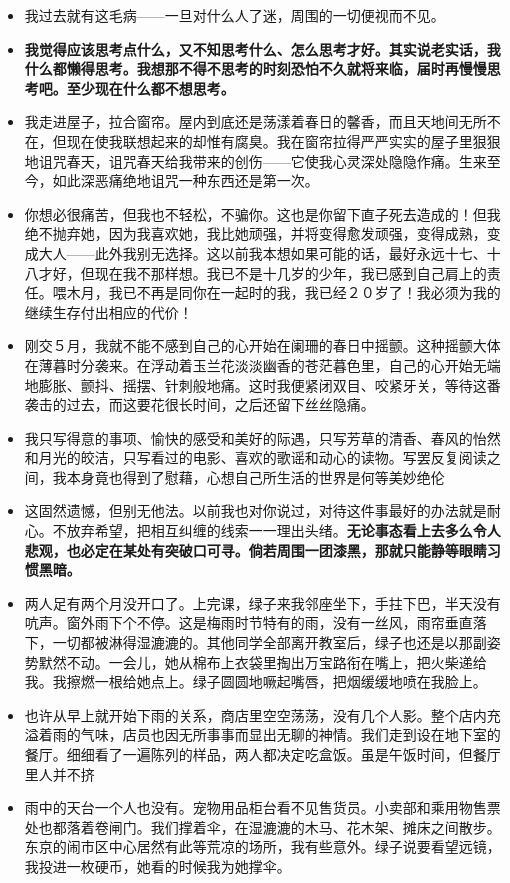 \documentclass[UTF8,a4paper,8pt]{ctexart}
\begin{document}
\begin{itemize}
 	\item 我过去就有这毛病——一旦对什么人了迷，周围的一切便视而不见。
 	\item \textbf{我觉得应该思考点什么，又不知思考什么、怎么思考才好。其实说老实话，我什么都懒得思考。我想那不得不思考的时刻恐怕不久就将来临，届时再慢慢思考吧。至少现在什么都不想思考。}
 	\item 我走进屋子，拉合窗帘。屋内到底还是荡漾着春日的馨香，而且天地间无所不在，但现在使我联想起来的却惟有腐臭。我在窗帘拉得严严实实的屋子里狠狠地诅咒春天，诅咒春天给我带来的创伤——它使我心灵深处隐隐作痛。生来至今，如此深恶痛绝地诅咒一种东西还是第一次。
 	\item 你想必很痛苦，但我也不轻松，不骗你。这也是你留下直子死去造成的！但我绝不抛弃她，因为我喜欢她，我比她顽强，并将变得愈发顽强，变得成熟，变成大人——此外我别无选择。这以前我本想如果可能的话，最好永远十七、十八才好，但现在我不那样想。我已不是十几岁的少年，我已感到自己肩上的责任。喂木月，我已不再是同你在一起时的我，我已经２０岁了！我必须为我的继续生存付出相应的代价！
 	\item 刚交５月，我就不能不感到自己的心开始在阑珊的春日中摇颤。这种摇颤大体在薄暮时分袭来。在浮动着玉兰花淡淡幽香的苍茫暮色里，自己的心开始无端地膨胀、颤抖、摇摆、针刺般地痛。这时我便紧闭双目、咬紧牙关，等待这番袭击的过去，而这要花很长时间，之后还留下丝丝隐痛。
 	\item 我只写得意的事项、愉快的感受和美好的际遇，只写芳草的清香、春风的怡然和月光的皎洁，只写看过的电影、喜欢的歌谣和动心的读物。写罢反复阅读之间，我本身竟也得到了慰藉，心想自己所生活的世界是何等美妙绝伦
 	\item 这固然遗憾，但别无他法。以前我也对你说过，对待这件事最好的办法就是耐心。不放弃希望，把相互纠缠的线索一一理出头绪。\textbf{无论事态看上去多么令人悲观，也必定在某处有突破口可寻。倘若周围一团漆黑，那就只能静等眼睛习惯黑暗。}
 	\item 两人足有两个月没开口了。上完课，绿子来我邻座坐下，手拄下巴，半天没有吭声。窗外雨下个不停。这是梅雨时节特有的雨，没有一丝风，雨帘垂直落下，一切都被淋得湿漉漉的。其他同学全部离开教室后，绿子也还是以那副姿势默然不动。一会儿，她从棉布上衣袋里掏出万宝路衔在嘴上，把火柴递给我。我擦燃一根给她点上。绿子圆圆地噘起嘴唇，把烟缓缓地喷在我脸上。
 	\item 也许从早上就开始下雨的关系，商店里空空荡荡，没有几个人影。整个店内充溢着雨的气味，店员也因无所事事而显出无聊的神情。我们走到设在地下室的餐厅。细细看了一遍陈列的样品，两人都决定吃盒饭。虽是午饭时间，但餐厅里人并不挤
 	\item 雨中的天台一个人也没有。宠物用品柜台看不见售货员。小卖部和乘用物售票处也都落着卷闸门。我们撑着伞，在湿漉漉的木马、花木架、摊床之间散步。东京的闹市区中心居然有此等荒凉的场所，我有些意外。绿子说要看望远镜，我投进一枚硬币，她看的时候我为她撑伞。

\end{itemize}
\end{document}

